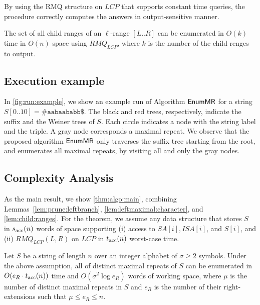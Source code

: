 By using the RMQ structure on $LCP$ that supports constant time queries, the procedure correctly computes the answers in output-sensitive manner. 


\begin{lemma}\label{lem:genchildren}
  The set of all child ranges of an $\ell$-range $[L..R]$ can be enumerated in $O(k)$ time in $O(n)$ space
  using $RMQ_{LCP}$, 
where $k$ is the number of the child renges to output.  
\end{lemma}


\subsection{Execution example}

In \cref{fig:run:example}, we show an example run of Algorithm $\textsf{EnumMR}$ for a string $S[0..10] = \mathtt{\#aabaababb\$}$. The black and red trees, respectively, indicate the suffix and the Weiner trees of $S$. Each circle indicates a node with the string label and the triple. A gray node corresponds a maximal repeat. 
We observe that the proposed algorithm $\textsf{EnumMR}$ only traverses the suffix tree starting from the root, and enumerates all maximal repeats, by visiting all and only the gray nodes. 


\subsection{Complexity Analysis}
As the main result, we show \cref{thm:algo:main}, 
combining Lemmas~\ref{lem:prune:leftbranch},
\ref{lem:leftmaximal:character}, and 
\ref{lem:child:ranges}.
For the theorem, we assume any data structure that stores $S$ in $s_{\mathrm{acc}}(n)$ words of space supporting (i) access to $SA[i], ISA[i]$, and $S[i]$, and (ii) $RMQ_{LCP}(L, R)$ on $LCP$ in $t_{\mathrm{acc}}(n)$ worst-case time.

\begin{theorem}\label{thm:algo:main}
  Let $S$ be a string of length $n$ over an integer alphabet of $\sigma\ge 2$ symbols.
  Under the above assumption, all of distinct maximal repeats of $S$ can be enumerated in $O(e_R\cdot t_{\mathrm{acc}}(n))$ time and $O(\sigma^2 \log e_R)$ words of working space, where $\mu$ is the number of distinct maximal repeats in $S$ and  $e_R$ is the number of their right-extensions such that $\mu \le e_R \le n$. 
\end{theorem}


